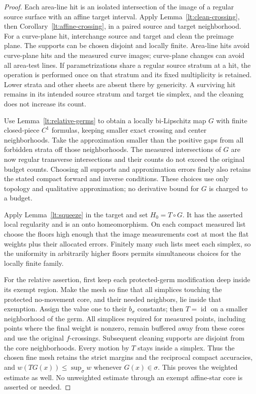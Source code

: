 \documentclass[11pt]{article}
\numberwithin{equation}{section}
\theoremstyle{definition}
\theoremstyle{remark}
\newcommand{\Id}{\operatorname{id}}
\begin{document}
\begin{proof}
Each area-line hit is an isolated intersection of the image of a
regular source surface with an affine target interval.  Apply
Lemma~\ref{lt:clean-crossing}, then Corollary~\ref{lt:affine-crossing},
in a paired source and target neighborhood.  For a curve-plane hit,
interchange source and target and clean the preimage plane.  The
supports can be chosen disjoint and locally finite.  Area-line hits
avoid curve-plane hits and the measured curve images; curve-plane
changes can avoid all area-test lines.  If parametrizations share a
regular source stratum at a hit, the operation is performed once on
that stratum and its fixed multiplicity is retained.  Lower strata
and other sheets are absent there by genericity.  A surviving hit
remains in its intended source stratum and target tie simplex, and
the cleaning does not increase its count.

Use Lemma~\ref{lt:relative-germs} to obtain a locally bi-Lipschitz
map $G$ with finite closed-piece $C^1$ formulas, keeping smaller
exact crossing and center neighborhoods.  Take the approximation
smaller than the positive gaps from all forbidden strata off those
neighborhoods.  The measured intersections of $G$ are now regular
transverse intersections and their counts do not exceed the
original budget counts.  Choosing all supports and approximation
errors finely also retains the stated compact forward and inverse
conditions.  These choices use only topology and qualitative
approximation; no derivative bound for $G$ is charged to a budget.

Apply Lemma~\ref{lt:squeeze} in the target and set $H_0=T\circ G$.
It has the asserted local regularity and is an onto homeomorphism.
On each compact measured list choose the floors high enough that
the image measurements cost at most the flat weights plus their
allocated errors.  Finitely many such lists meet each simplex, so
the uniformity in arbitrarily higher floors permits simultaneous
choices for the locally finite family.

For the relative assertion, first keep each protected-germ modification
deep inside its exempt region.  Make the mesh so fine that all
simplices touching the protected no-movement core, and their needed
neighbors, lie inside that exemption.  Assign the value one to
their $b_\sigma$ constants; then $T=\Id$ on a smaller neighborhood
of the germ.  All simplices required for measured points, including
points where the final weight is nonzero, remain buffered away
from these cores and use the original $f$-crossings.  Subsequent
cleaning supports are disjoint from the core neighborhoods.
Every motion by $T$ stays inside a simplex.  Thus the chosen fine
mesh retains the strict margins and the reciprocal compact
accuracies, and $w(TG(x))\leq\sup_\sigma w$ whenever $G(x)\in\sigma$.
This proves the weighted estimate as well.  No unweighted estimate
through an exempt affine-star core is asserted or needed.
\end{proof}
\end{document}
